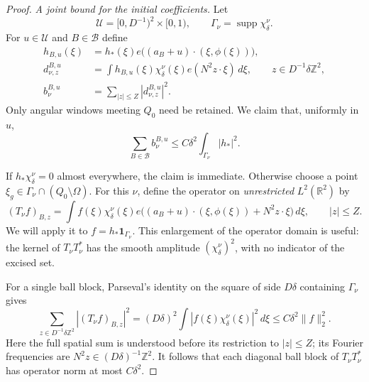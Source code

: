 \begin{proof}
\emph{A joint bound for the initial coefficients.}
Let
\[
 \mathcal U=[0,D^{-1})^2\times[0,1),\qquad
 \Gamma_\nu=\operatorname{supp}\chi_\delta^\nu.
\]
For $u\in\mathcal U$ and $B\in\mathcal B$ define
\begin{equation}\label{eq:sparse-analysis}
 \begin{split}
 h_{B,u}(\xi)
   &=h_*(\xi)e\big((a_B+u)\cdot(\xi,\phi(\xi))\big),\\
 d^{B,u}_{\nu,z}
   &=\int h_{B,u}(\xi)\chi_\delta^\nu(\xi)
                         e(N^2z\cdot\xi)\,d\xi,
       \qquad z\in D^{-1}\delta\mathbb Z^2,\\
 b_\nu^{B,u}&=\sum_{|z|\leq Z}|d^{B,u}_{\nu,z}|^2.
 \end{split}
\end{equation}
Only angular windows meeting $Q_0$ need be retained.  We claim that,
uniformly in $u$,
\begin{equation}\label{eq:sparse-joint-mass}
 \sum_{B\in\mathcal B}b_\nu^{B,u}
 \leq C\delta^2\int_{\Gamma_\nu}|h_*|^2.
\end{equation}

If $h_*\chi_\delta^\nu=0$ almost everywhere, the claim is immediate.
Otherwise choose a point $\xi_g\in\Gamma_\nu\cap(Q_0\setminus\Omega)$.
For this $\nu$, define the operator on \emph{unrestricted}
$L^2(\mathbb R^2)$ by
\[
 (T_\nu f)_{B,z}
 =\int f(\xi)\chi_\delta^\nu(\xi)
   e\big((a_B+u)\cdot(\xi,\phi(\xi))+N^2z\cdot\xi\big)\,d\xi,
 \qquad |z|\leq Z.
\]
We will apply it to $f=h_*\mathbf1_{\Gamma_\nu}$.  This enlargement
of the operator domain is useful: the kernel of $T_\nu T_\nu^*$ has
the smooth amplitude $(\chi_\delta^\nu)^2$, with no indicator of the
excised set.

For a single ball block, Parseval's identity on the square of side
$D\delta$ containing $\Gamma_\nu$ gives
\[
 \sum_{z\in D^{-1}\delta\mathbb Z^2}|(T_\nu f)_{B,z}|^2
 = (D\delta)^2\int |f(\xi)\chi_\delta^\nu(\xi)|^2\,d\xi
 \leq C\delta^2\|f\|_2^2.
\]
Here the full spatial sum is understood before its restriction to
$|z|\leq Z$; its Fourier frequencies are
$N^2z\in(D\delta)^{-1}\mathbb Z^2$.  It follows that each diagonal
ball block of $T_\nu T_\nu^*$ has operator norm at most $C\delta^2$.


\end{proof}
